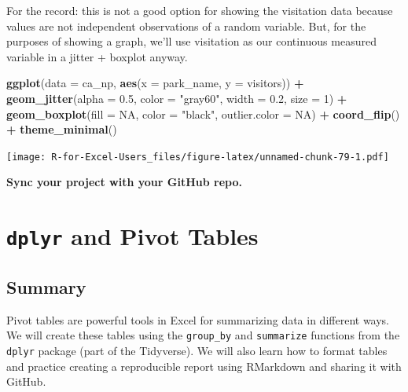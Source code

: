 \documentclass[]{book}
\newenvironment{Shaded}{\begin{snugshade}}{\end{snugshade}}
\newcommand{\DataTypeTok}[1]{\textcolor[rgb]{0.13,0.29,0.53}{#1}}
\newcommand{\DecValTok}[1]{\textcolor[rgb]{0.00,0.00,0.81}{#1}}
\newcommand{\FloatTok}[1]{\textcolor[rgb]{0.00,0.00,0.81}{#1}}
\newcommand{\KeywordTok}[1]{\textcolor[rgb]{0.13,0.29,0.53}{\textbf{#1}}}
\newcommand{\NormalTok}[1]{#1}
\newcommand{\OperatorTok}[1]{\textcolor[rgb]{0.81,0.36,0.00}{\textbf{#1}}}
\newcommand{\OtherTok}[1]{\textcolor[rgb]{0.56,0.35,0.01}{#1}}
\newcommand{\StringTok}[1]{\textcolor[rgb]{0.31,0.60,0.02}{#1}}
\begin{document}
For the record: this is not a good option for showing the visitation data because values are not independent observations of a random variable. But, for the purposes of showing a graph, we'll use visitation as our continuous measured variable in a jitter + boxplot anyway.

\begin{Shaded}
\begin{Highlighting}[]
\KeywordTok{ggplot}\NormalTok{(}\DataTypeTok{data =}\NormalTok{ ca_np, }\KeywordTok{aes}\NormalTok{(}\DataTypeTok{x =}\NormalTok{ park_name, }\DataTypeTok{y =}\NormalTok{ visitors)) }\OperatorTok{+}
\StringTok{  }\KeywordTok{geom_jitter}\NormalTok{(}\DataTypeTok{alpha =} \FloatTok{0.5}\NormalTok{,}
              \DataTypeTok{color =} \StringTok{"gray60"}\NormalTok{,}
              \DataTypeTok{width =} \FloatTok{0.2}\NormalTok{,}
              \DataTypeTok{size =} \DecValTok{1}\NormalTok{) }\OperatorTok{+}
\StringTok{  }\KeywordTok{geom_boxplot}\NormalTok{(}\DataTypeTok{fill =} \OtherTok{NA}\NormalTok{,}
               \DataTypeTok{color =} \StringTok{"black"}\NormalTok{,}
               \DataTypeTok{outlier.color =} \OtherTok{NA}\NormalTok{) }\OperatorTok{+}
\StringTok{  }\KeywordTok{coord_flip}\NormalTok{() }\OperatorTok{+}
\StringTok{  }\KeywordTok{theme_minimal}\NormalTok{()}
\end{Highlighting}
\end{Shaded}

\texttt{[image: R-for-Excel-Users\_files/figure-latex/unnamed-chunk-79-1.pdf]}

\textbf{Sync your project with your GitHub repo.}

\hypertarget{pivot}{%
\chapter{\texorpdfstring{\texttt{dplyr} and Pivot Tables}{dplyr and Pivot Tables}}\label{pivot}}

\hypertarget{summary-4}{%
\section{Summary}\label{summary-4}}

Pivot tables are powerful tools in Excel for summarizing data in different ways. We will create these tables using the \texttt{group\_by} and \texttt{summarize} functions from the \texttt{dplyr} package (part of the Tidyverse). We will also learn how to format tables and practice creating a reproducible report using RMarkdown and sharing it with GitHub.
\end{document}
